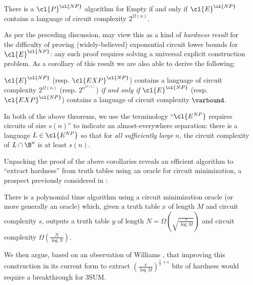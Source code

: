 \begin{theorem*}
There is a $\cl{P}^\cl{NP}$ algorithm for {\sc Empty} if and only if $\cl{E}^\cl{NP}$ contains a language of circuit complexity $2^{\Omega(n)}$.
\end{theorem*}
As per the preceding discussion, may view this as a kind of \emph{hardness result} for the difficulty of proving (widely-believed) exponential circuit lower bounds for $\cl{E}^\cl{NP}$: any such proof requires solving a universal explicit construction problem. As a corollary of this result we are also able to derive the following:
\begin{theorem*}
$\cl{E}^\cl{NP}$ (resp. $\cl{EXP}^\cl{NP}$)  contains a language of circuit complexity $2^{\Omega(n)}$ (resp. $2^{n^{\Omega(1)}}$) \emph{if and only if} $\cl{E}^\cl{NP}$ (resp. $\cl{EXP}^\cl{NP}$) contains a language of circuit complexity $\varbound$.
\end{theorem*}

In both of the above theorems, we use the terminology ``$\cl{E^{NP}}$ requires circuits of size $s(n)$'' to indicate an almost-everywhere separation: there is a language $L \in \cl{E^{NP}}$ so that for \emph{all sufficiently large} $n$, the circuit complexity of $L \cap \B^n$ is at least $s(n)$.

Unpacking the proof of the above corollaries reveals an efficient algorithm to ``extract hardness'' from truth tables using an oracle for circuit minimization, a prospect previously considered in \cite{hardness-harder}:

\begin{theorem*}
There is a polynomial time algorithm using a circuit minimization oracle (or more generally an  oracle) which, given a truth table $x$ of length $M$ and circuit complexity $s$, outputs a truth table $y$ of length $N = {\Omega}(\sqrt{\frac{s}{\log M}})$ and circuit complexity $\Omega(\frac{N}{\log N})$.
\end{theorem*}

We then argue, based on an observation of Williams \cite{sat-lb}, that improving this construction in its current form to extract $(\frac{s}{\log M})^{\frac{1}{2} + \epsilon}$ bits of hardness would require a breakthrough for {\sc 3SUM}.

